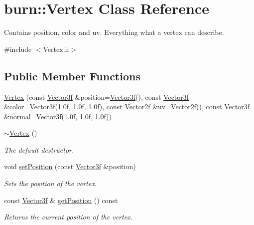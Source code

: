 \hypertarget{classburn_1_1_vertex}{\section{burn\-:\-:Vertex Class Reference}
\label{classburn_1_1_vertex}
}


Contains position, color and uv. Everything what a vertex can describe.  




{\ttfamily \#include $<$Vertex.\-h$>$}

\subsection*{Public Member Functions}
\begin{DoxyCompactItemize}
\item 
\hyperlink{classburn_1_1_vertex_aa387f73cc33b830457c492cd8009bb38}{Vertex} (const \hyperlink{namespaceburn_a9d6d349c94bc4dc9699427216128a0ef}{Vector3f} \&position=\hyperlink{namespaceburn_a9d6d349c94bc4dc9699427216128a0ef}{Vector3f}(), const \hyperlink{namespaceburn_a9d6d349c94bc4dc9699427216128a0ef}{Vector3f} \&color=\hyperlink{namespaceburn_a9d6d349c94bc4dc9699427216128a0ef}{Vector3f}(1.\-0f, 1.\-0f, 1.\-0f), const Vector2f \&uv=\-Vector2f(), const Vector3f \&normal=\-Vector3f(1.\-0f, 1.\-0f, 1.\-0f))
\item 
\hyperlink{classburn_1_1_vertex_ad950d9459711c1ba4223de35623f75b6}{$\sim$\-Vertex} ()
\begin{DoxyCompactList}\small\item\em The default destructor. \end{DoxyCompactList}\item 
void \hyperlink{classburn_1_1_vertex_aa38bae183bbe857f9fabeb8e5510e9a0}{set\-Position} (const \hyperlink{namespaceburn_a9d6d349c94bc4dc9699427216128a0ef}{Vector3f} \&position)
\begin{DoxyCompactList}\small\item\em Sets the position of the vertex. \end{DoxyCompactList}\item 
const \hyperlink{namespaceburn_a9d6d349c94bc4dc9699427216128a0ef}{Vector3f} \& \hyperlink{classburn_1_1_vertex_afdc13277da83f244302ddfc1b6863444}{get\-Position} () const 
\begin{DoxyCompactList}\small\item\em Returns the current position of the vertex. \end{DoxyCompactList}\item 

\end{DoxyCompactItemize}
